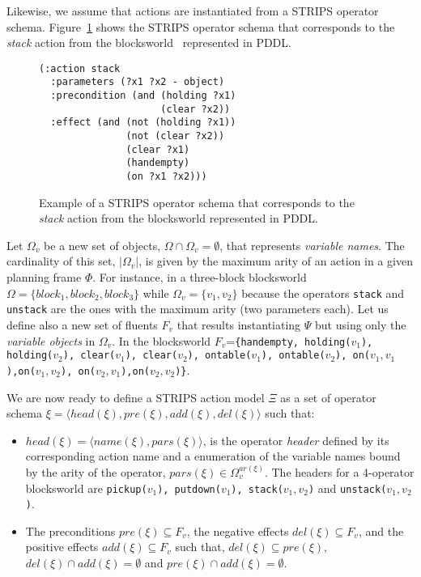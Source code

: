 \documentclass[letterpaper]{article} %
\newcommand{\tup}[1]{{\langle #1 \rangle}}
\begin{document}
Likewise, we assume that actions are instantiated from a STRIPS operator schema. Figure~\ref{fig:stack} shows the STRIPS operator schema that corresponds to the {\em stack} action from the blocksworld~\cite{slaney2001blocks} represented in PDDL.
\begin{figure}[hbt]
\begin{footnotesize}
\begin{verbatim}
(:action stack
  :parameters (?x1 ?x2 - object)
  :precondition (and (holding ?x1) 
                     (clear ?x2))
  :effect (and (not (holding ?x1)) 
               (not (clear ?x2))
               (clear ?x1) 
               (handempty) 
               (on ?x1 ?x2)))
\end{verbatim}
\end{footnotesize}
 \caption{\small Example of a STRIPS operator schema that corresponds to the {\em stack} action from the blocksworld represented in PDDL.}
\label{fig:stack}
\end{figure}

Let $\Omega_v$ be a new set of objects, $\Omega\cap\Omega_v=\emptyset$, that represents {\em variable names}. The cardinality of this set, $|\Omega_v|$, is given by the maximum arity of an action in a given planning frame $\Phi$. For instance, in a three-block blocksworld $\Omega=\{block_1, block_2, block_3\}$ while $\Omega_v=\{v_1, v_2\}$ because the operators {\small\tt stack} and {\small\tt unstack} are the ones with the maximum arity (two parameters each). Let us define also a new set of fluents $F_{v}$ that results instantiating $\Psi$ but using only the {\em variable objects} in $\Omega_v$. In the blocksworld $F_v$={\small\tt\{handempty, holding($v_1$), holding($v_2$), clear($v_1$), clear($v_2$), ontable($v_1$), ontable($v_2$), on($v_1,v_1$),on($v_1,v_2$), on($v_2,v_1$),on($v_2,v_2$)\}}.

We are now ready to define a STRIPS action model $\Xi$ as a set of operator schema $\xi=\tup{head(\xi),pre(\xi),add(\xi),del(\xi)}$ such that:
\begin{itemize}
\item $head(\xi)=\tup{name(\xi),pars(\xi)}$, is the operator {\em header} defined by its corresponding action name and a enumeration of the variable names bound by the arity of the operator, $pars(\xi)\in\Omega_v^{ar(\xi)}$. The headers for a 4-operator blocksworld are {\small\tt pickup($v_1$), putdown($v_1$), stack($v_1,v_2$)} and {\small\tt unstack($v_1,v_2$)}.
\item The preconditions $pre(\xi)\subseteq F_v$, the negative effects $del(\xi)\subseteq F_v$, and the positive effects $add(\xi)\subseteq F_v$ such that, $del(\xi)\subseteq pre(\xi)$, $del(\xi)\cap add(\xi)=\emptyset$ and $pre(\xi)\cap add(\xi)=\emptyset$.
\end{itemize}
\end{document}
